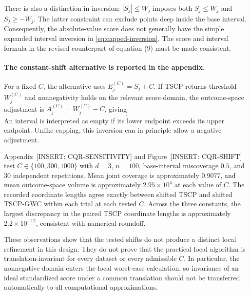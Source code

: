 \documentclass[11pt]{article}
\numberwithin{equation}{section}
\newcommand{\pending}[1]{\textcolor{AuthorRed}{[INSERT: #1]}}
\newcommand{\AppCQR}{Appendix~\pending{CQR-SENSITIVITY}} %
\newcommand{\FigShift}{Figure~\pending{CQR-SHIFT}} %
\begin{document}
There is also a distinction in inversion: $|S_j|\leq W_j$ imposes
both $S_j\leq W_j$ and $S_j\geq-W_j$. The latter constraint can
exclude points deep inside the base interval. Consequently, the
absolute-value score does not generally have the simple expanded
interval inversion in \eqref{eq:capped-inversion}. The score and
interval formula in the revised counterpart of equation (9) must
be made consistent.

\paragraph{The constant-shift alternative is reported in the appendix.}
For a fixed $C$, the alternative uses $E_j^{(C)}=S_j+C$. If TSCP
returns threshold $W_j^{(C)}$ and nonnegativity holds on the
relevant score domain, the outcome-space adjustment is
$A_j^{(C)}=W_j^{(C)}-C$, giving
\begin{equation}
 [\widehat q_{\ell,j}(x)-A_j^{(C)},
  \widehat q_{u,j}(x)+A_j^{(C)}].
 \label{eq:shifted-inversion}
\end{equation}
An interval is interpreted as empty if its lower endpoint exceeds
its upper endpoint. Unlike capping, this inversion can in principle
allow a negative adjustment.

\AppCQR{} and \FigShift{} test $C\in\{100,300,1000\}$ with
$d=3$, $n=100$, base-interval miscoverage $0.5$, and 30 independent
repetitions. Mean joint coverage is approximately $0.9077$, and
mean outcome-space volume is approximately $2.95\times10^4$ at
each value of $C$. The recorded coordinate lengths agree exactly
between shifted TSCP and shifted TSCP-GWC within each trial at each
tested $C$. Across the three constants, the largest discrepancy in
the paired TSCP coordinate lengths is approximately
$2.2\times10^{-12}$, consistent with numerical roundoff.

These observations show that the tested shifts do not produce a
distinct local refinement in this design. They do not prove that
the practical local algorithm is translation-invariant for every
dataset or every admissible $C$. In particular, the nonnegative
domain enters the local worst-case calculation, so invariance of
an ideal standardized score under a common translation should not
be transferred automatically to all computational approximations.
\end{document}
